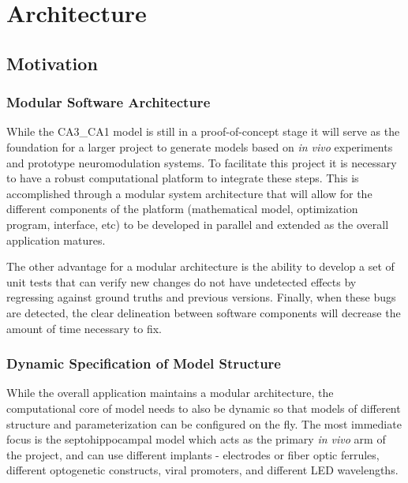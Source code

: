 \documentclass[11pt, oneside]{article}   	%
\begin{document}
%

\section{Architecture}
\subsection{Motivation}
\subsubsection{Modular Software Architecture}
While the CA3\_CA1 model is still in a proof-of-concept stage it will serve as the foundation for a larger project to generate models based on \textit{in vivo} experiments and prototype neuromodulation systems. To facilitate this project it is necessary to have a robust computational platform to integrate these steps. This is accomplished through a modular system architecture that will allow for the different components of the platform (mathematical model, optimization program, interface, etc) to be developed in parallel and extended as the overall application matures. 

The other advantage for a modular architecture is the ability to develop a set of unit tests that can verify new changes do not have undetected effects by regressing against ground truths and previous versions. Finally, when these bugs are detected, the clear delineation between software components will decrease the amount of time necessary to fix. 

\subsubsection{Dynamic Specification of Model Structure}
While the overall application maintains a modular architecture, the computational core of model needs to also be dynamic so that models of different structure and parameterization can be configured on the fly. The most immediate focus is the septohippocampal model which acts as the primary \textit{in vivo} arm of the project, and can use different implants - electrodes or fiber optic ferrules, different optogenetic constructs, viral promoters, and different LED wavelengths.
\end{document}
